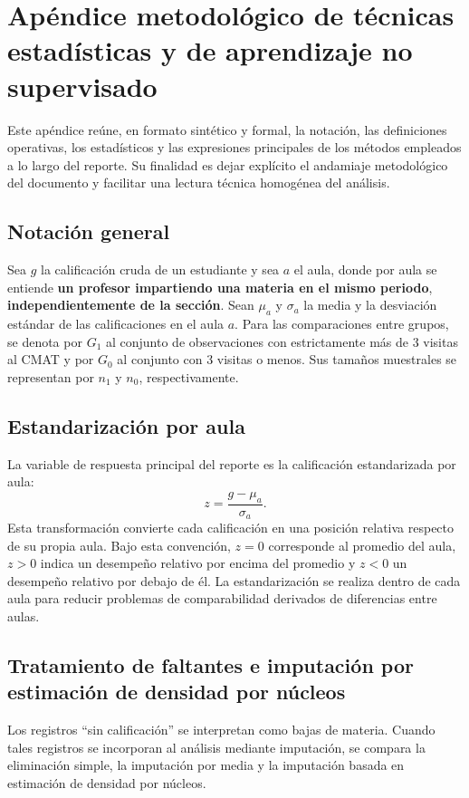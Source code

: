 \documentclass[10pt,letterpaper]{article} %
\numberwithin{figure}{subsection}
\begin{document}
\appendix
\newpage
\section{Apéndice metodológico de técnicas estadísticas y de aprendizaje no supervisado}

Este apéndice reúne, en formato sintético y formal, la notación, las definiciones operativas, los estadísticos y las expresiones principales de los métodos empleados a lo largo del reporte. Su finalidad es dejar explícito el andamiaje metodológico del documento y facilitar una lectura técnica homogénea del análisis.

\subsection{Notación general}
Sea $g$ la calificación cruda de un estudiante y sea $a$ el aula, donde por aula se entiende \textbf{un profesor impartiendo una materia en el mismo periodo}, \textbf{independientemente de la sección}. Sean $\mu_a$ y $\sigma_a$ la media y la desviación estándar de las calificaciones en el aula $a$. Para las comparaciones entre grupos, se denota por $G_1$ al conjunto de observaciones con estrictamente más de 3 visitas al CMAT y por $G_0$ al conjunto con 3 visitas o menos. Sus tamaños muestrales se representan por $n_1$ y $n_0$, respectivamente.

\subsection{Estandarización por aula}
La variable de respuesta principal del reporte es la calificación estandarizada por aula:
\[
z=\frac{g-\mu_a}{\sigma_a}.
\]
Esta transformación convierte cada calificación en una posición relativa respecto de su propia aula. Bajo esta convención, $z=0$ corresponde al promedio del aula, $z>0$ indica un desempeño relativo por encima del promedio y $z<0$ un desempeño relativo por debajo de él. La estandarización se realiza dentro de cada aula para reducir problemas de comparabilidad derivados de diferencias entre aulas.

\subsection{Tratamiento de faltantes e imputación por estimación de densidad por núcleos}
Los registros ``sin calificación'' se interpretan como bajas de materia. Cuando tales registros se incorporan al análisis mediante imputación, se compara la eliminación simple, la imputación por media y la imputación basada en estimación de densidad por núcleos.
\end{document}
